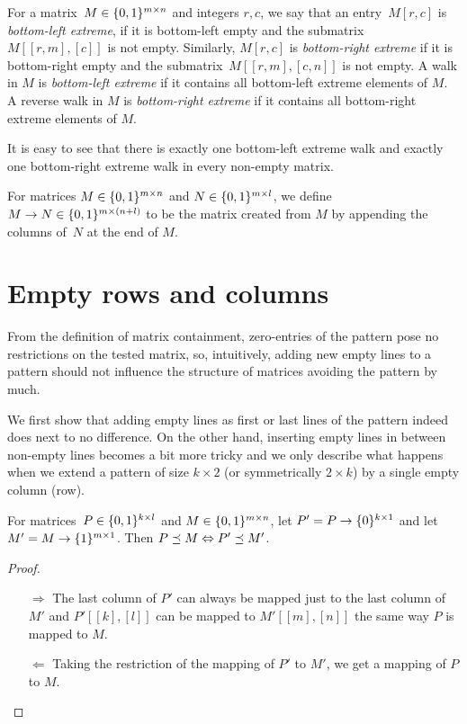 \begin{defn}
For a matrix~$M\in\{0,1\}^{m\times n}$ and integers $r,c$, we say that an entry~$M[r,c]$ is \emph{bottom-left extreme}, if it is bottom-left empty and the submatrix~$M[[r,m],[c]]$ is not empty. Similarly, $M[r,c]$ is \emph{bottom-right extreme} if it is bottom-right empty and the submatrix~$M[[r,m],[c,n]]$ is not empty. A walk in $M$ is \emph{bottom-left extreme} if it contains all bottom-left extreme elements of $M$. A reverse walk in $M$ is \emph{bottom-right extreme} if it contains all bottom-right extreme elements of $M$.
\end{defn}

It is easy to see that there is exactly one bottom-left extreme walk and exactly one bottom-right extreme walk in every non-empty matrix.

\begin{defn}
For matrices $M\in\{0,1\}^{m\times n}$ and $N\in\{0,1\}^{m\times l}$, we define $M\rightarrow N\in\{0,1\}^{m\times(n+l)}$ to be the matrix created from $M$ by appending the columns of~$N$ at the end of $M$.
\end{defn}

\section{Empty rows and columns}
\label{sec:empty}
From the definition of matrix containment, zero-entries of the pattern pose no restrictions on the tested matrix, so, intuitively, adding new empty lines to a pattern should not influence the structure of matrices avoiding the pattern by much.

We first show that adding empty lines as first or last lines of the pattern indeed does next to no difference. On the other hand, inserting empty lines in between non-empty lines becomes a bit more tricky and we only describe what happens when we extend a pattern of size $k\times2$ (or symmetrically $2\times k$) by a single empty column (row).

\begin{obs}
\label{obs:emptyrows}
For matrices~$P\in\{0,1\}^{k\times l}$ and $M\in\{0,1\}^{m\times n}$, let $P'=P\rightarrow\{0\}^{k\times1}$ and let $M'=M\rightarrow\{1\}^{m\times1}$. Then $P\preceq M\Leftrightarrow P'\preceq M'$.
\end{obs}
\begin{proof}
\begin{itemize}
	\item[$\Rightarrow$] The last column of $P'$ can always be mapped just to the last column of $M'$ and $P'[[k],[l]]$ can be mapped to $M'[[m],[n]]$ the same way $P$ is mapped to $M$.
	\item[$\Leftarrow$] Taking the restriction of the mapping of $P'$ to $M'$, we get a mapping of $P$ to $M$. \qedhere
\end{itemize}
\end{proof}

